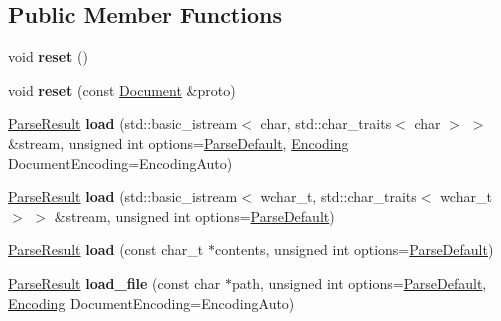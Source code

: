 \subsection*{Public Member Functions}
\begin{DoxyCompactItemize}
\item 
\hypertarget{classphys_1_1xml_1_1Document_aadb3e68da9cf95b1193f915136f9a7e5}{
void {\bfseries reset} ()}
\label{dd/d44/classphys_1_1xml_1_1Document_aadb3e68da9cf95b1193f915136f9a7e5}

\item 
\hypertarget{classphys_1_1xml_1_1Document_a8d79b0e71457e8a64f331fd4cc117a86}{
void {\bfseries reset} (const \hyperlink{classphys_1_1xml_1_1Document}{Document} \&proto)}
\label{dd/d44/classphys_1_1xml_1_1Document_a8d79b0e71457e8a64f331fd4cc117a86}

\item 
\hypertarget{classphys_1_1xml_1_1Document_a481bb17790901c270163dc1b7f4824e8}{
\hyperlink{structphys_1_1xml_1_1ParseResult}{ParseResult} {\bfseries load} (std::basic\_\-istream$<$ char, std::char\_\-traits$<$ char $>$ $>$ \&stream, unsigned int options=\hyperlink{namespacephys_1_1xml_aa6b8f7f8c2322fd683a235b498834d60}{ParseDefault}, \hyperlink{namespacephys_1_1xml_a420f5de782438f88160321385bea2015}{Encoding} DocumentEncoding=EncodingAuto)}
\label{dd/d44/classphys_1_1xml_1_1Document_a481bb17790901c270163dc1b7f4824e8}

\item 
\hypertarget{classphys_1_1xml_1_1Document_acb57d77f011b7544475c7a799f6f7f10}{
\hyperlink{structphys_1_1xml_1_1ParseResult}{ParseResult} {\bfseries load} (std::basic\_\-istream$<$ wchar\_\-t, std::char\_\-traits$<$ wchar\_\-t $>$ $>$ \&stream, unsigned int options=\hyperlink{namespacephys_1_1xml_aa6b8f7f8c2322fd683a235b498834d60}{ParseDefault})}
\label{dd/d44/classphys_1_1xml_1_1Document_acb57d77f011b7544475c7a799f6f7f10}

\item 
\hypertarget{classphys_1_1xml_1_1Document_a6a0f671943e92d5a341ddabee3f80b5d}{
\hyperlink{structphys_1_1xml_1_1ParseResult}{ParseResult} {\bfseries load} (const char\_\-t $\ast$contents, unsigned int options=\hyperlink{namespacephys_1_1xml_aa6b8f7f8c2322fd683a235b498834d60}{ParseDefault})}
\label{dd/d44/classphys_1_1xml_1_1Document_a6a0f671943e92d5a341ddabee3f80b5d}

\item 
\hypertarget{classphys_1_1xml_1_1Document_a499bf5d32e87eea40fcda0161fcbfb06}{
\hyperlink{structphys_1_1xml_1_1ParseResult}{ParseResult} {\bfseries load\_\-file} (const char $\ast$path, unsigned int options=\hyperlink{namespacephys_1_1xml_aa6b8f7f8c2322fd683a235b498834d60}{ParseDefault}, \hyperlink{namespacephys_1_1xml_a420f5de782438f88160321385bea2015}{Encoding} DocumentEncoding=EncodingAuto)}
\label{dd/d44/classphys_1_1xml_1_1Document_a499bf5d32e87eea40fcda0161fcbfb06}


\end{DoxyCompactItemize}
